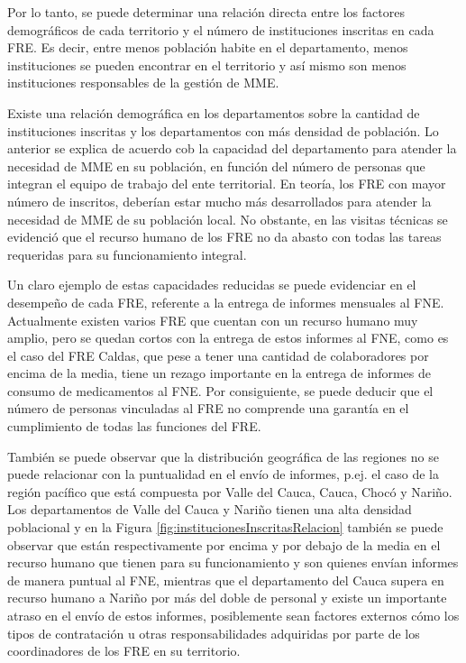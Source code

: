 \documentclass[
]{book}
\begin{document}
Por lo tanto, se puede determinar una relación directa entre los factores demográficos de cada territorio y el número de instituciones inscritas en cada FRE. Es decir, entre menos población habite en el departamento, menos instituciones se pueden encontrar en el territorio y así mismo son menos instituciones responsables de la gestión de MME.

Existe una relación demográfica en los departamentos sobre la cantidad de instituciones inscritas y los departamentos con más densidad de población. Lo anterior se explica de acuerdo cob la capacidad del departamento para atender la necesidad de MME en su población, en función del número de personas que integran el equipo de trabajo del ente territorial. En teoría, los FRE con mayor número de inscritos, deberían estar mucho más desarrollados para atender la necesidad de MME de su población local. No obstante, en las visitas técnicas se evidenció que el recurso humano de los FRE no da abasto con todas las tareas requeridas para su funcionamiento integral.

Un claro ejemplo de estas capacidades reducidas se puede evidenciar en el desempeño de cada FRE, referente a la entrega de informes mensuales al FNE. Actualmente existen varios FRE que cuentan con un recurso humano muy amplio, pero se quedan cortos con la entrega de estos informes al FNE, como es el caso del FRE Caldas, que pese a tener una cantidad de colaboradores por encima de la media, tiene un rezago importante en la entrega de informes de consumo de medicamentos al FNE. Por consiguiente, se puede deducir que el número de personas vinculadas al FRE no comprende una garantía en el cumplimiento de todas las funciones del FRE.

También se puede observar que la distribución geográfica de las regiones no se puede relacionar con la puntualidad en el envío de informes, p.ej. el caso de la región pacífico que está compuesta por Valle del Cauca, Cauca, Chocó y Nariño. Los departamentos de Valle del Cauca y Nariño tienen una alta densidad poblacional y en la Figura \ref{fig:institucionesInscritasRelacion} también se puede observar que están respectivamente por encima y por debajo de la media en el recurso humano que tienen para su funcionamiento y son quienes envían informes de manera puntual al FNE, mientras que el departamento del Cauca supera en recurso humano a Nariño por más del doble de personal y existe un importante atraso en el envío de estos informes, posiblemente sean factores externos cómo los tipos de contratación u otras responsabilidades adquiridas por parte de los coordinadores de los FRE en su territorio.
\end{document}
